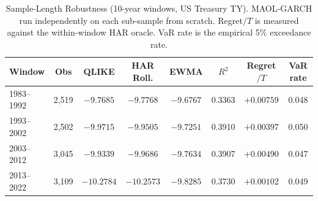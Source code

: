 \begin{table}[H]
\centering
\caption{Sample-Length Robustness (10-year windows, US Treasury TY). MAOL-GARCH run independently on each sub-sample from scratch. Regret$/T$ is measured against the within-window HAR oracle. VaR rate is the empirical 5\% exceedance rate.}
\label{tab:sl_10y}
\small
\begin{tabular}{lccccccc}
\toprule
Window & Obs & QLIKE & HAR Roll. & EWMA & $R^2$ & Regret$/T$ & VaR rate \\
\midrule
1983--1992 & 2,519 & $-9.7685$ & $-9.7768$ & $-9.6767$ & 0.3363 & $+0.00759$ & 0.048 \\
1993--2002 & 2,502 & $-9.9715$ & $-9.9505$ & $-9.7251$ & 0.3910 & $+0.00397$ & 0.050 \\
2003--2012 & 3,045 & $-9.9339$ & $-9.9686$ & $-9.7634$ & 0.3907 & $+0.00490$ & 0.047 \\
2013--2022 & 3,109 & $-10.2784$ & $-10.2573$ & $-9.8285$ & 0.3730 & $+0.00102$ & 0.049 \\
\bottomrule
\end{tabular}
\end{table}
